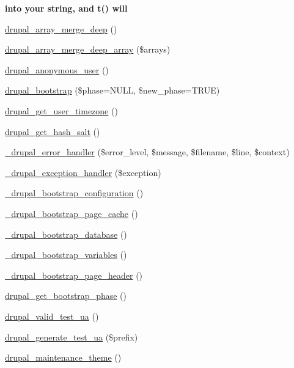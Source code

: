 \begin{Indent}{\bf into your string, and t() will}
\begin{DoxyCompactItemize}
\item 
\hyperlink{bootstrap_8inc_a4e822805ef55b0a271ab181c9620837a}{drupal\_\-array\_\-merge\_\-deep} ()
\item 
\hyperlink{bootstrap_8inc_a1167ab45bbb945a5e6fd806b536eef70}{drupal\_\-array\_\-merge\_\-deep\_\-array} (\$arrays)
\item 
\hyperlink{bootstrap_8inc_a9ad783f833f89bccb8ca03e960e3d33d}{drupal\_\-anonymous\_\-user} ()
\item 
\hyperlink{bootstrap_8inc_a8dcad7737ed560086bcdd9998a020a93}{drupal\_\-bootstrap} (\$phase=NULL, \$new\_\-phase=TRUE)
\item 
\hyperlink{bootstrap_8inc_aab3e512ebe00778d1f7fe97db22b4d9d}{drupal\_\-get\_\-user\_\-timezone} ()
\item 
\hyperlink{bootstrap_8inc_a832314334940cc1578689241d665d7e8}{drupal\_\-get\_\-hash\_\-salt} ()
\item 
\hyperlink{bootstrap_8inc_a81d5c3fc0ad3470c5071a001ba9b5a8b}{\_\-drupal\_\-error\_\-handler} (\$error\_\-level, \$message, \$filename, \$line, \$context)
\item 
\hyperlink{bootstrap_8inc_a42a79128a6db4edc9865224a2b90f8f5}{\_\-drupal\_\-exception\_\-handler} (\$exception)
\item 
\hyperlink{bootstrap_8inc_ad6a32cc1a865d168128b5a16ce8630d9}{\_\-drupal\_\-bootstrap\_\-configuration} ()
\item 
\hyperlink{bootstrap_8inc_a18e86c70c220ef294a9aaa5bdc756bce}{\_\-drupal\_\-bootstrap\_\-page\_\-cache} ()
\item 
\hyperlink{bootstrap_8inc_accb161e8cea2fd1fdfece6d6f087e195}{\_\-drupal\_\-bootstrap\_\-database} ()
\item 
\hyperlink{bootstrap_8inc_a2ea55f223f5f1c6ddcfcdfe4a11782db}{\_\-drupal\_\-bootstrap\_\-variables} ()
\item 
\hyperlink{bootstrap_8inc_aaec7ee804d0de51e5632a28a286578aa}{\_\-drupal\_\-bootstrap\_\-page\_\-header} ()
\item 
\hyperlink{bootstrap_8inc_aef1090e39844ccfc688f9b93fd048d8d}{drupal\_\-get\_\-bootstrap\_\-phase} ()
\item 
\hyperlink{bootstrap_8inc_abdfb3ad2d4e0a21b9319296b2f4e25e2}{drupal\_\-valid\_\-test\_\-ua} ()
\item 
\hyperlink{bootstrap_8inc_a58a494e2753af5f55a59dae53ceab3ac}{drupal\_\-generate\_\-test\_\-ua} (\$prefix)
\item 
\hyperlink{bootstrap_8inc_a861d3f7c553fe62829f6c0f2e4fe89e6}{drupal\_\-maintenance\_\-theme} ()

\end{DoxyCompactItemize}
\end{Indent}
